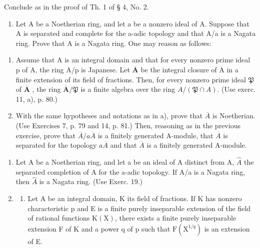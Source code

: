 Conclude as in the proof of Th. 1 of § 4, No. 2.

\begin{enumerate}
\def\labelenumi{\arabic{enumi})}
\setcounter{enumi}{18}
\tightlist
\item
  Let A be a Noetherian ring, and let a be a nonzero ideal of A. Suppose that A is separated and complete for the a-adic topology and that A/a is a Nagata ring. Prove that A is a Nagata ring. One may reason as follows:
\end{enumerate}

\begin{enumerate}
\def\labelenumi{\alph{enumi})}
\item
  Assume that A is an integral domain and that for every nonzero prime ideal p of A, the ring A/p is Japanese. Let \(\overline{\mathbf{A}}\) be the integral closure of A in a finite extension of its field of fractions. Then, for every nonzero prime ideal \(\mathfrak{P}\) of \(\overline{\mathbf{A}}\) , the ring \(\overline{\mathbf{A}}/\mathfrak{P}\) is a finite algebra over the ring \(A/(\mathfrak{P} \cap A)\). (Use exerc. 11, a), p. 80.)
\item
  With the same hypotheses and notations as in a), prove that \(\overline{A}\) is Noetherian. (Use Exercises 7, p. 79 and 14, p. 81.) Then, reasoning as in the previous exercise, prove that \(\overline{A}/a\overline{A}\) is a finitely generated A-module, that \(\overline{A}\) is separated for the topology \(a\overline{A}\) and that \(\overline{A}\) is a finitely generated A-module.
\end{enumerate}

\begin{enumerate}
\def\labelenumi{\arabic{enumi})}
\setcounter{enumi}{19}
\item
  Let A be a Noetherian ring, and let a be an ideal of A distinct from A, \(\hat{A}\) the separated completion of A for the a-adic topology. If A/a is a Nagata ring, then \(\hat{A}\) is a Nagata ring. (Use Exerc. 19.)
\item
  \begin{enumerate}
  \def\labelenumii{\alph{enumii})}
  \tightlist
  \item
    Let A be an integral domain, K its field of fractions. If K has nonzero characteristic p and E is a finite purely inseparable extension of the field of rational functions \(\mathrm{K}(\mathrm{X})\), there exists a finite purely inseparable extension F of K and a power q of p such that \(\mathrm{F}(\mathrm{X}^{1/q})\) is an extension of E.
  \end{enumerate}
\end{enumerate}

